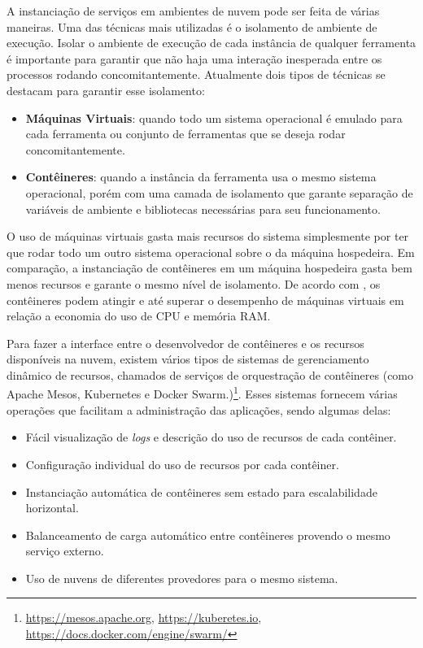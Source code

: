 A instanciação de serviços em ambientes de nuvem pode ser feita de várias maneiras. Uma das técnicas mais utilizadas é o isolamento de ambiente de execução. Isolar o ambiente de execução de cada instância de qualquer ferramenta é importante para garantir que não haja uma interação inesperada entre os processos rodando concomitantemente.
Atualmente dois tipos de técnicas se destacam para garantir esse isolamento:
\begin{itemize}
    \item \textbf{Máquinas Virtuais}: quando todo um sistema operacional é emulado para cada ferramenta ou conjunto de ferramentas que se deseja rodar concomitantemente. 
    \item \textbf{Contêineres}: quando a instância da ferramenta usa o mesmo sistema operacional, porém com uma camada de isolamento que garante separação de variáveis de ambiente e bibliotecas necessárias para seu funcionamento.
\end{itemize}

O uso de máquinas virtuais gasta mais recursos do sistema simplesmente por ter que rodar todo um outro sistema operacional sobre o da máquina hospedeira. Em comparação, a instanciação de contêineres em um máquina hospedeira gasta bem menos recursos e garante o mesmo nível de isolamento. De acordo com  \cite{7095802}, os contêineres podem atingir e até superar o desempenho de máquinas virtuais em relação a economia do uso de CPU e memória RAM. %

Para fazer a interface entre o desenvolvedor de contêineres e os recursos disponíveis na nuvem, existem vários tipos de sistemas de gerenciamento dinâmico de recursos, chamados de serviços de orquestração de contêineres (como Apache Mesos, Kubernetes e Docker Swarm.)\footnote{\url{https://mesos.apache.org}, \url{ https://kuberetes.io}, \url{https://docs.docker.com/engine/swarm/}}. Esses sistemas fornecem várias operações que facilitam a administração das aplicações, sendo algumas delas:
\begin{itemize}
    \item Fácil visualização de \textit{logs} e descrição do uso de recursos de cada contêiner.
    \item Configuração individual do uso de recursos por cada contêiner.
    \item Instanciação automática de contêineres sem estado para escalabilidade horizontal.
    \item Balanceamento de carga automático %
    entre contêineres provendo o mesmo serviço externo.
    \item Uso de nuvens de diferentes provedores para o mesmo sistema.
\end{itemize}


